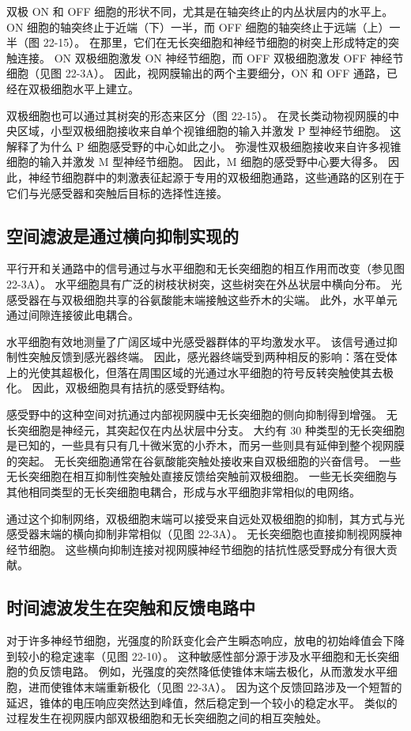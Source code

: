 双极 ON 和 OFF 细胞的形状不同，尤其是在轴突终止的内丛状层内的水平上。 ON 细胞的轴突终止于近端（下）一半，而 OFF 细胞的轴突终止于远端（上）一半（图 22-15）。 在那里，它们在无长突细胞和神经节细胞的树突上形成特定的突触连接。 ON 双极细胞激发 ON 神经节细胞，而 OFF 双极细胞激发 OFF 神经节细胞（见图 22-3A）。 因此，视网膜输出的两个主要细分，ON 和 OFF 通路，已经在双极细胞水平上建立。

双极细胞也可以通过其树突的形态来区分（图 22-15）。 在灵长类动物视网膜的中央区域，小型双极细胞接收来自单个视锥细胞的输入并激发 P 型神经节细胞。 这解释了为什么 P 细胞感受野的中心如此之小。 弥漫性双极细胞接收来自许多视锥细胞的输入并激发 M 型神经节细胞。 因此，M 细胞的感受野中心要大得多。 因此，神经节细胞群中的刺激表征起源于专用的双极细胞通路，这些通路的区别在于它们与光感受器和突触后目标的选择性连接。

\subsection{空间滤波是通过横向抑制实现的}
平行开和关通路中的信号通过与水平细胞和无长突细胞的相互作用而改变（参见图 22-3A）。 水平细胞具有广泛的树枝状树突，这些树突在外丛状层中横向分布。 光感受器在与双极细胞共享的谷氨酸能末端接触这些乔木的尖端。 此外，水平单元通过间隙连接彼此电耦合。

水平细胞有效地测量了广阔区域中光感受器群体的平均激发水平。 该信号通过抑制性突触反馈到感光器终端。 因此，感光器终端受到两种相反的影响：落在受体上的光使其超极化，但落在周围区域的光通过水平细胞的符号反转突触使其去极化。 因此，双极细胞具有拮抗的感受野结构。

感受野中的这种空间对抗通过内部视网膜中无长突细胞的侧向抑制得到增强。 无长突细胞是神经元，其突起仅在内丛状层中分支。 大约有 30 种类型的无长突细胞是已知的，一些具有只有几十微米宽的小乔木，而另一些则具有延伸到整个视网膜的突起。 无长突细胞通常在谷氨酸能突触处接收来自双极细胞的兴奋信号。 一些无长突细胞在相互抑制性突触处直接反馈给突触前双极细胞。 一些无长突细胞与其他相同类型的无长突细胞电耦合，形成与水平细胞非常相似的电网络。

通过这个抑制网络，双极细胞末端可以接受来自远处双极细胞的抑制，其方式与光感受器末端的横向抑制非常相似（见图 22-3A）。 无长突细胞也直接抑制视网膜神经节细胞。 这些横向抑制连接对视网膜神经节细胞的拮抗性感受野成分有很大贡献。

\subsection{时间滤波发生在突触和反馈电路中}
对于许多神经节细胞，光强度的阶跃变化会产生瞬态响应，放电的初始峰值会下降到较小的稳定速率（见图 22-10）。 这种敏感性部分源于涉及水平细胞和无长突细胞的负反馈电路。 例如，光强度的突然降低使锥体末端去极化，从而激发水平细胞，进而使锥体末端重新极化（见图 22-3A）。 因为这个反馈回路涉及一个短暂的延迟，锥体的电压响应突然达到峰值，然后稳定到一个较小的稳定水平。 类似的过程发生在视网膜内部双极细胞和无长突细胞之间的相互突触处。

